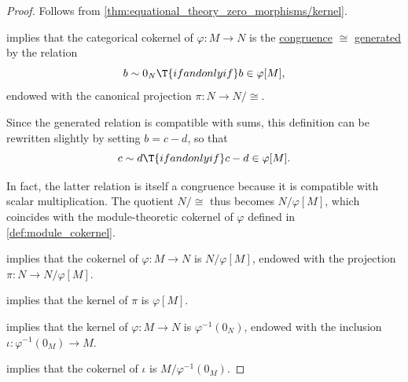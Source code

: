 \begin{proof}
   Follows from \cref{thm:equational_theory_zero_morphisms/kernel}.

    implies that the categorical cokernel of \( \varphi: M \to N \) is the \hyperref[def:fol_congruence]{congruence} \( {\cong} \) \hyperref[def:fol_generated_congruence]{generated} by the relation
  \begin{equation*}
    b \sim 0_N \T{if and only if} b \in \varphi[M],
  \end{equation*}
  endowed with the canonical projection \( \pi: N \to N / {\cong} \).

  Since the generated relation is compatible with sums, this definition can be rewritten slightly by setting \( b = c - d \), so that
  \begin{equation*}
    c \sim d \T{if and only if} c - d \in \varphi[M].
  \end{equation*}

  In fact, the latter relation is itself a congruence because it is compatible with scalar multiplication. The quotient \( N / {\cong} \) thus becomes \( N / \varphi[M] \), which coincides with the module-theoretic cokernel of \( \varphi \) defined in \cref{def:module_cokernel}.

    implies that the cokernel of \( \varphi: M \to N \) is \( N / \varphi[M] \), endowed with the projection \( \pi: N \to N / \varphi[M] \).

   implies that the kernel of \( \pi \) is \( \varphi[M] \).

    implies that the kernel of \( \varphi: M \to N \) is \( \varphi^{-1}(0_N) \), endowed with the inclusion \( \iota: \varphi^{-1}(0_M) \to M \).

   implies that the cokernel of \( \iota \) is \( M / \varphi^{-1}(0_M) \).
\end{proof}

